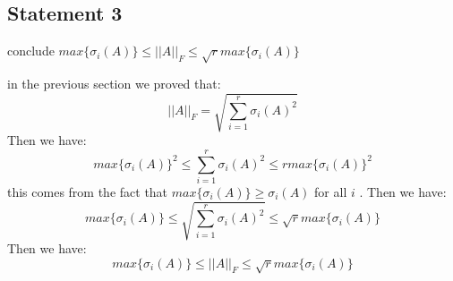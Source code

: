 \subsection{Statement 3}
conclude $max\{\sigma_i(A)\} \leq ||A||_F \leq \sqrt{r} max\{\sigma_i(A)\}$
\begin{qsolve}
	\begin{qsolve}[]
		in the previous section we proved that:
		$$||A||_F = \sqrt{\sum_{i=1}^{r} \sigma_i(A)^2}$$
		Then we have:
		$$max\{\sigma_i(A)\}^2 \leq \sum_{i=1}^{r} \sigma_i(A)^2 \leq r max\{\sigma_i(A)\}^2$$
		this comes from the fact that $max\{\sigma_i(A)\} \geq \sigma_i(A)$ for all $i$ .
		Then we have:
		$$max\{\sigma_i(A)\} \leq \sqrt{\sum_{i=1}^{r} \sigma_i(A)^2} \leq \sqrt{r} max\{\sigma_i(A)\}$$
		Then we have:
		$$max\{\sigma_i(A)\} \leq ||A||_F \leq \sqrt{r} max\{\sigma_i(A)\}$$
	\end{qsolve}
\end{qsolve}
